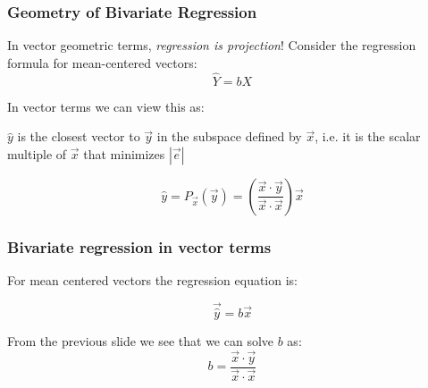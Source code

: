 \documentclass{beamer}
\begin{document}
\begin{frame}
  \frametitle{Geometry of Bivariate Regression}

  In vector geometric terms, \emph{regression is projection}! Consider the regression formula for mean-centered vectors:
\[
  \widehat{Y} = bX
\]
  
In vector terms we can view this as:

\begin{center}

\end{center}

$\widehat{y}$ is the closest vector to $\vec{y}$ in the subspace defined by $\vec{x}$, i.e. it is the scalar multiple of $\vec{x}$ that minimizes $|\vec{e}|$ 

\[
\widehat{y} = P_{\vec{x}}(\vec{y}) =  \left(\frac{\vec{x} \cdot \vec{y}}{\vec{x} \cdot \vec{x}}\right) \vec{x}
\]







\end{frame}

\begin{frame}
  \frametitle{Bivariate regression in vector terms}

For mean centered vectors the regression equation is:

  \[
    \vec{\widehat{y}} = b \vec{x}
  \]

From the previous slide we see that we can solve $b$ as: 
\[
b = \frac{\vec{x} \cdot \vec{y}}{\vec{x} \cdot \vec{x}}
\]
\end{frame}
\end{document}
